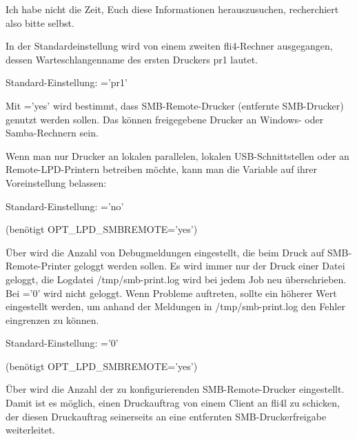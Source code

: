 \begin{description}
    Ich habe nicht die Zeit, Euch diese Informationen herauszusuchen,
    recherchiert also bitte selbst.

    In der Standardeinstellung wird von einem zweiten fli4-Rechner
    ausgegangen, dessen Warteschlangenname des ersten Druckers pr1 lautet.

    Standard-Einstellung: ='pr1'



    Mit ='yes' wird bestimmt, dass
    SMB-Remote-Drucker (entfernte SMB-Drucker) genutzt werden sollen. Das können
    freigegebene Drucker an Windows- oder Samba-Rechnern sein.


    Wenn man nur Drucker an lokalen parallelen, lokalen USB-Schnittstellen oder
    an Remote-LPD-Printern betreiben möchte, kann man die Variable auf ihrer
    Voreinstellung belassen:

    Standard-Einstellung: ='no'


 (benötigt OPT\_LPD\_SMBREMOTE='yes')

    Über  wird die Anzahl von Debugmeldungen
    eingestellt, die beim Druck auf SMB-Remote-Printer geloggt werden sollen.
    Es wird immer nur der Druck einer Datei geloggt, die Logdatei
    /tmp/smb-print.log wird bei jedem Job neu überschrieben.
    Bei ='0' wird nicht geloggt. Wenn Probleme
    auftreten, sollte ein höherer Wert eingestellt werden, um anhand der
    Meldungen in /tmp/smb-print.log den Fehler eingrenzen zu können.

    Standard-Einstellung: ='0'


 (benötigt OPT\_LPD\_SMBREMOTE='yes')

    Über  wird die Anzahl der zu konfigurierenden
    SMB-Remote-Drucker eingestellt. Damit ist es möglich, einen Druckauftrag von
    einem Client an fli4l zu schicken, der diesen Druckauftrag seinerseits an
    eine entfernten SMB-Druckerfreigabe weiterleitet.


\end{description}
